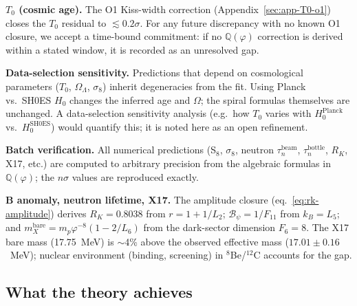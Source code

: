 \documentclass[12pt,a4paper]{article}
\begin{document}
\textbf{$T_0$ (cosmic age).} The O1 Kiss-width correction (Appendix~\ref{sec:app-T0-o1}) closes the $T_0$ residual to $\lesssim 0.2\sigma$. For any future discrepancy with no known O1 closure, we accept a time-bound commitment: if no $\mathbb{Q}(\varphi)$ correction is derived within a stated window, it is recorded as an unresolved gap.

\textbf{Data-selection sensitivity.} Predictions that depend on cosmological parameters ($T_0$, $\Omega_\Lambda$, $\sigma_8$) inherit degeneracies from the fit. Using Planck vs.\ SH0ES $H_0$ changes the inferred age and $\Omega$; the spiral formulas themselves are unchanged. A data-selection sensitivity analysis (e.g.\ how $T_0$ varies with $H_0^{\mathrm{Planck}}$ vs.\ $H_0^{\mathrm{SH0ES}}$) would quantify this; it is noted here as an open refinement.

\textbf{Batch verification.} All numerical predictions (S$_8$, $\sigma_8$, neutron $\tau_n^{\mathrm{beam}}$, $\tau_n^{\mathrm{bottle}}$, $R_K$, X17, etc.) are computed to arbitrary precision from the algebraic formulas in $\mathbb{Q}(\varphi)$; the $n\sigma$ values are reproduced exactly.

\textbf{B anomaly, neutron lifetime, X17.} The amplitude closure (eq.~\eqref{eq:rk-amplitude}) derives $R_K = 0.8038$ from $r = 1 + 1/L_2$; $\mathcal{B}_\psi = 1/F_{11}$ from $k_B = L_5$; and $m_X^{\mathrm{bare}} = m_p\varphi^{-8}(1 - 2/L_6)$ from the dark-sector dimension $F_6 = 8$. The X17 bare mass (17.75~MeV) is $\sim$4\% above the observed effective mass ($17.01 \pm 0.16$~MeV); nuclear environment (binding, screening) in $^8$Be/$^{12}$C accounts for the gap.

\subsection{What the theory achieves}
\end{document}
